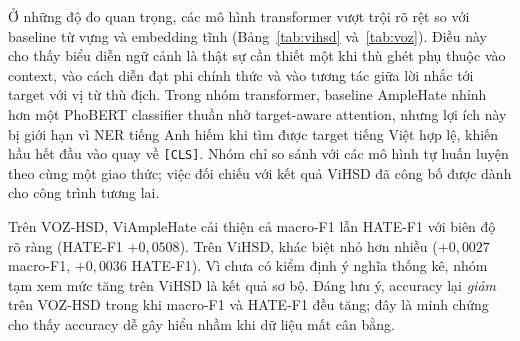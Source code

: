 \documentclass[11pt]{article}
\begin{document}
Ở những độ đo quan trọng, các mô hình transformer vượt trội rõ rệt so với baseline từ vựng và embedding tĩnh (Bảng~\ref{tab:vihsd} và~\ref{tab:voz}). Điều này cho thấy biểu diễn ngữ cảnh là thật sự cần thiết một khi thù ghét phụ thuộc vào context, vào cách diễn đạt phi chính thức và vào tương tác giữa lời nhắc tới target với vị từ thù địch. Trong nhóm transformer, baseline AmpleHate nhỉnh hơn một PhoBERT classifier thuần nhờ target-aware attention, nhưng lợi ích này bị giới hạn vì NER tiếng Anh hiếm khi tìm được target tiếng Việt hợp lệ, khiến hầu hết đầu vào quay về \texttt{[CLS]}. Nhóm chỉ so sánh với các mô hình tự huấn luyện theo cùng một giao thức; việc đối chiếu với kết quả ViHSD đã công bố được dành cho công trình tương lai.

Trên VOZ-HSD, ViAmpleHate cải thiện cả macro-F1 lẫn HATE-F1 với biên độ rõ ràng (HATE-F1 $+0{,}0508$). Trên ViHSD, khác biệt nhỏ hơn nhiều ($+0{,}0027$ macro-F1, $+0{,}0036$ HATE-F1). Vì chưa có kiểm định ý nghĩa thống kê, nhóm tạm xem mức tăng trên ViHSD là kết quả sơ bộ. Đáng lưu ý, accuracy lại \emph{giảm} trên VOZ-HSD trong khi macro-F1 và HATE-F1 đều tăng; đây là minh chứng cho thấy accuracy dễ gây hiểu nhầm khi dữ liệu mất cân bằng.
\end{document}
